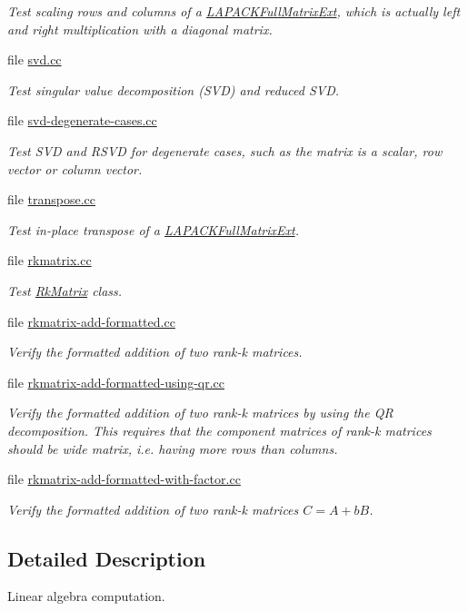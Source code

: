 \begin{DoxyCompactItemize}
\begin{DoxyCompactList}\small\item\em Test scaling rows and columns of a \hyperlink{classLAPACKFullMatrixExt}{L\+A\+P\+A\+C\+K\+Full\+Matrix\+Ext}, which is actually left and right multiplication with a diagonal matrix. \end{DoxyCompactList}\item 
file \hyperlink{svd_8cc}{svd.\+cc}
\begin{DoxyCompactList}\small\item\em Test singular value decomposition (S\+VD) and reduced S\+VD. \end{DoxyCompactList}\item 
file \hyperlink{svd-degenerate-cases_8cc}{svd-\/degenerate-\/cases.\+cc}
\begin{DoxyCompactList}\small\item\em Test S\+VD and R\+S\+VD for degenerate cases, such as the matrix is a scalar, row vector or column vector. \end{DoxyCompactList}\item 
file \hyperlink{transpose_8cc}{transpose.\+cc}
\begin{DoxyCompactList}\small\item\em Test in-\/place transpose of a \hyperlink{classLAPACKFullMatrixExt}{L\+A\+P\+A\+C\+K\+Full\+Matrix\+Ext}. \end{DoxyCompactList}\item 
file \hyperlink{rkmatrix_8cc}{rkmatrix.\+cc}
\begin{DoxyCompactList}\small\item\em Test \hyperlink{classRkMatrix}{Rk\+Matrix} class. \end{DoxyCompactList}\item 
file \hyperlink{rkmatrix-add-formatted_8cc}{rkmatrix-\/add-\/formatted.\+cc}
\begin{DoxyCompactList}\small\item\em Verify the formatted addition of two rank-\/k matrices. \end{DoxyCompactList}\item 
file \hyperlink{rkmatrix-add-formatted-using-qr_8cc}{rkmatrix-\/add-\/formatted-\/using-\/qr.\+cc}
\begin{DoxyCompactList}\small\item\em Verify the formatted addition of two rank-\/k matrices by using the QR decomposition. This requires that the component matrices of rank-\/k matrices should be wide matrix, i.\+e. having more rows than columns. \end{DoxyCompactList}\item 
file \hyperlink{rkmatrix-add-formatted-with-factor_8cc}{rkmatrix-\/add-\/formatted-\/with-\/factor.\+cc}
\begin{DoxyCompactList}\small\item\em Verify the formatted addition of two rank-\/k matrices $C = A + b B$. \end{DoxyCompactList}\end{DoxyCompactItemize}


\subsection{Detailed Description}
Linear algebra computation. 

